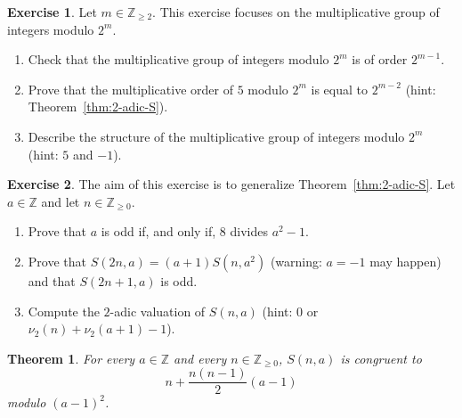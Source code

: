 \documentclass[12pt]{article}
\newcommand{\bZ}{\mathbb{Z}}
\newcommand{\bN}{\bZ_{\ge 0}}%
\newcommand{\bNdeux}{\bZ_{\ge 2}}
\newtheorem{theorem}{Theorem}
\theoremstyle{definition}
\newtheorem{exercise}{Exercise}
\begin{document}
\begin{exercise}
   Let $m \in \bNdeux$.
   This exercise focuses on the multiplicative group of integers modulo $2^m$.
   \begin{enumerate}
   \item Check that the multiplicative group of integers modulo $2^m$ is of order $2^{m - 1}$.
   \item Prove that the multiplicative order of $5$ modulo $2^m$ is equal to $2^{m - 2}$
     (hint: Theorem~\ref{thm:2-adic-S}).
   \item Describe the structure of the multiplicative group of integers modulo $2^m$ (hint: $5$ and $-1$).
 \end{enumerate}
\end{exercise}

\begin{exercise}
  The aim of this exercise is to generalize Theorem~\ref{thm:2-adic-S}.
  Let $a \in \bZ$ and let $n \in \bN$.
  \begin{enumerate}
  \item Prove that $a$ is odd if, and only if, $8$ divides $a^2 - 1$.
  \item Prove that $S(2 n, a) = (a + 1) S(n, a^2)$ (warning: $a = - 1$ may happen) and that $S(2n + 1, a)$ is odd. 
  \item Compute the $2$-adic valuation of $S(n, a)$  (hint: $0$ or $\nu_2(n) + \nu_2(a + 1) - 1$).
  \end{enumerate}
\end{exercise}

\begin{theorem} \label{thm:DL-Sn-am}
  For every $a \in \bZ$ and every $n \in \bN$,
  $S(n, a)$ is congruent to
  $$
  n + \frac{n(n - 1)}{2}  {(a - 1)}
  $$ modulo ${(a - 1)}^2$.
 \end{theorem}
\end{document}
